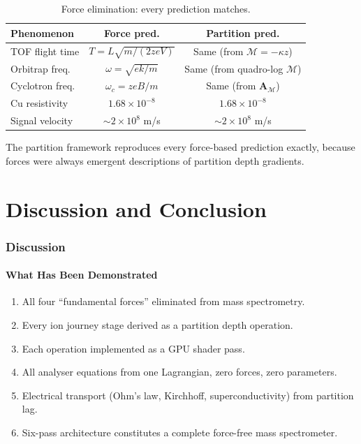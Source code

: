 \documentclass[11pt,twocolumn,a4paper]{article}
\theoremstyle{definition}
\theoremstyle{remark}
\newcommand{\Depth}{\mathcal{M}}
\newcommand{\Apartition}{\mathbf{A}_{\mathcal{M}}}
\begin{document}
\begin{table}[H]
\centering
\caption{Force elimination: every prediction matches.}
\small
\begin{tabular}{lcc}
\toprule
\textbf{Phenomenon} & \textbf{Force pred.} & \textbf{Partition pred.} \\
\midrule
TOF flight time & $T = L\sqrt{m/(2zeV)}$ & Same (from $\Depth = -\kappa z$) \\
Orbitrap freq. & $\omega = \sqrt{ek/m}$ & Same (from quadro-log $\Depth$) \\
Cyclotron freq. & $\omega_c = zeB/m$ & Same (from $\Apartition$) \\
Cu resistivity & $1.68\times 10^{-8}$ & $1.68\times 10^{-8}$ \\
Signal velocity & $\sim 2\times 10^8$ m/s & $\sim 2\times 10^8$ m/s \\
\bottomrule
\end{tabular}
\end{table}

The partition framework reproduces every force-based prediction exactly, because forces were always emergent descriptions of partition depth gradients.


\part{Discussion and Conclusion}

\section{Discussion}
\label{sec:discussion}

\subsection{What Has Been Demonstrated}

\begin{enumerate}[nosep]
\item All four ``fundamental forces'' eliminated from mass spectrometry.
\item Every ion journey stage derived as a partition depth operation.
\item Each operation implemented as a GPU shader pass.
\item All analyser equations from one Lagrangian, zero forces, zero parameters.
\item Electrical transport (Ohm's law, Kirchhoff, superconductivity) from partition lag.
\item Six-pass architecture constitutes a complete force-free mass spectrometer.
\end{enumerate}
\end{document}

